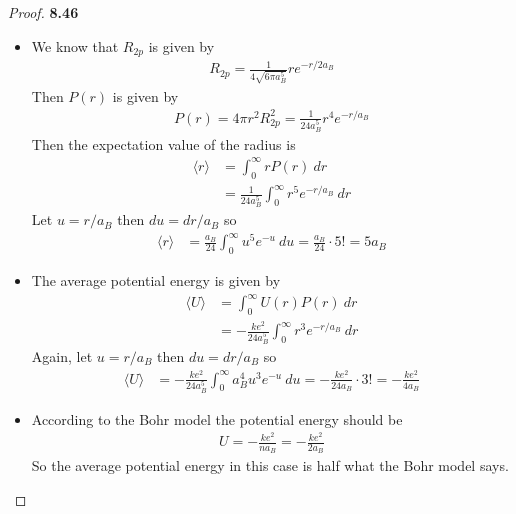 \documentclass[11pt]{article}
\theoremstyle{definition}
\begin{document}
\cleardoublepage
\begin{proof}{\textbf{8.46}}\\
\begin{itemize}
\item [\textbf{(a)}] We know that $R_{2p}$ is given by 
\begin{align*}
    R_{2p} = \frac{1}{4\sqrt{6\pi a_B^5}}re^{-r/2a_B}
\end{align*}
Then $P(r)$ is given by
\begin{align*}
    P(r) = 4\pi r^2 R_{2p}^2 = \frac{1}{24 a_B^5}r^4e^{-r/a_B}
\end{align*}
Then the expectation value of the radius is
\begin{align*}
    \langle r\rangle &= \int_0^\infty r P(r)~dr\\
    &= \frac{1}{24 a_B^5}\int_0^\infty r^5e^{-r/a_B}~dr
\end{align*}
Let $u = r/a_B$ then $du = dr/a_B$ so
\begin{align*}
    \langle r\rangle
    &= \frac{a_B}{24}\int_0^\infty u^5e^{-u}~du
    = \frac{a_B}{24}\cdot 5! = 5a_B
\end{align*}
\item [\textbf{(b)}] The average potential energy is given by
\begin{align*}
    \langle U\rangle &= \int_0^\infty U(r) P(r)~dr\\
    &= -\frac{ke^2}{24 a_B^5}\int_0^\infty r^3e^{-r/a_B}~dr
\end{align*}
Again, let $u = r/a_B$ then $du = dr/a_B$ so
\begin{align*}
    \langle U\rangle
    &= -\frac{ke^2}{24 a_B^5}\int_0^\infty a_B^4 u^3 e^{-u}~du
    = -\frac{ke^2}{24 a_B}\cdot 3! = -\frac{ke^2}{4 a_B}
\end{align*}
\item [\textbf{(c)}] According to the Bohr model the potential energy should be
\begin{align*}
    U = -\frac{ke^2}{na_B} = -\frac{ke^2}{2a_B}
\end{align*}
So the average potential energy in this case is half what the Bohr model says.
\end{itemize}
\end{proof}
\end{document}
